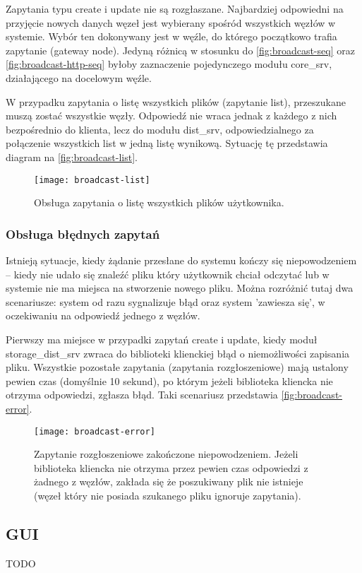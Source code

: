 Zapytania typu create i update nie są rozgłaszane. Najbardziej odpowiedni na przyjęcie nowych danych węzeł jest wybierany spośród wszystkich węzłów w systemie. Wybór ten dokonywany jest w węźle, do którego początkowo trafia zapytanie (gateway node). Jedyną różnicą w stosunku do \autoref{fig:broadcast-seq} oraz \autoref{fig:broadcast-http-seq} byłoby zaznaczenie pojedynczego modułu core\_srv, działającego na docelowym węźle.

W przypadku zapytania o listę wszystkich plików (zapytanie list), przeszukane muszą zostać wszystkie węzły. Odpowiedź nie wraca jednak z każdego z nich bezpośrednio do klienta, lecz do modułu dist\_srv, odpowiedzialnego za połączenie wszystkich list w jedną listę wynikową. Sytuację tę przedstawia diagram na \autoref{fig:broadcast-list}.

\begin{figure}[!htbp]
	\centering
	\texttt{[image: broadcast-list]}
	\caption[Zapytanie o listę plików.]{Obsługa zapytania o listę wszystkich plików użytkownika.}
	\label{fig:broadcast-list}
\end{figure}

\subsubsection{Obsługa błędnych zapytań}
Istnieją sytuacje, kiedy żądanie przesłane do systemu kończy się niepowodzeniem – kiedy nie udało się znaleźć pliku który użytkownik chciał odczytać lub w systemie nie ma miejsca na stworzenie nowego pliku. Można rozróżnić tutaj dwa scenariusze: system od razu sygnalizuje błąd oraz system 'zawiesza się', w oczekiwaniu na odpowiedź jednego z węzłów. 

Pierwszy ma miejsce w przypadki zapytań create i update, kiedy moduł storage\_dist\_srv zwraca do biblioteki klienckiej błąd o niemożliwości zapisania pliku. Wszystkie pozostałe zapytania (zapytania rozgłoszeniowe) mają ustalony pewien czas (domyślnie 10 sekund), po którym jeżeli biblioteka kliencka nie otrzyma odpowiedzi, zgłasza błąd. Taki scenariusz przedstawia \autoref{fig:broadcast-error}.

\begin{figure}[!htbp]
	\centering
	\texttt{[image: broadcast-error]}
	\caption[Zapytanie zakończone błędem.]{Zapytanie rozgłoszeniowe zakończone niepowodzeniem. Jeżeli biblioteka kliencka nie otrzyma przez pewien czas odpowiedzi z żadnego z węzłów, zakłada się że poszukiwany plik nie istnieje (węzeł który nie posiada szukanego pliku ignoruje zapytania).}
	\label{fig:broadcast-error}
\end{figure}











\subsection{GUI}
TODO